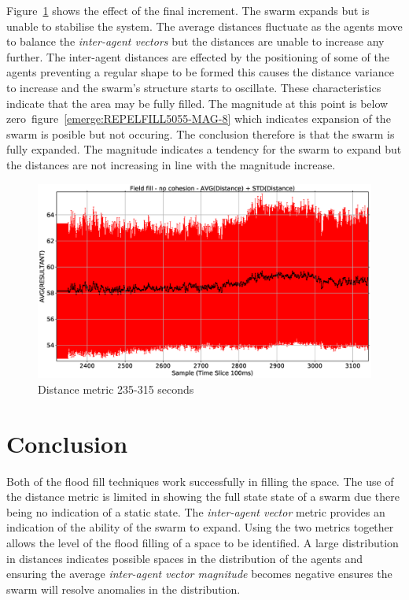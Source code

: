 Figure~\ref{emerge:REPELFILL5055-DIST-8} shows the effect of the final increment. The swarm expands but is unable to stabilise the system. The average distances fluctuate as the agents move to balance the \textit{inter-agent vectors} but the distances are unable to increase any further. The inter-agent distances are effected by the positioning of some of the agents preventing a regular shape to be formed this causes the distance variance to increase and the swarm's structure starts to oscillate. These characteristics indicate that the area may be fully filled. The magnitude at this point is below zero~figure~\ref{emerge:REPELFILL5055-MAG-8} which indicates expansion of the swarm is posible but not occuring. The conclusion therefore is that the swarm is fully expanded. The magnitude indicates a tendency for the swarm to expand but the distances are not increasing in line with the magnitude increase. 

\begin{figure}[H]
\begin{center}
\includegraphics[width=12cm]{CHAPTER-8/figures/REPELFILL5055-DIST-8}
\end{center}
\caption{Distance metric 235-315 seconds\label{emerge:REPELFILL5055-DIST-8}}
\end{figure}

\section{Conclusion}
Both of the flood fill techniques work successfully in filling the space. The use of the distance metric is limited in showing the full state state of a swarm due there being no indication of a static state. The \textit{inter-agent vector} metric provides an indication of the ability of the swarm to expand. Using the two metrics together allows the level of the flood filling of a space to be identified. A large distribution in distances indicates possible spaces in the distribution of the agents and ensuring the average \textit{inter-agent vector magnitude} becomes negative ensures the swarm will resolve anomalies in the distribution.

